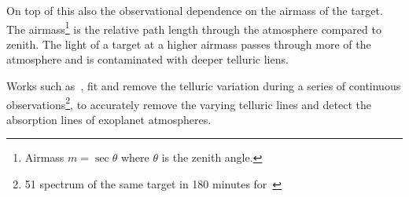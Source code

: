 On top of this also the observational dependence on the airmass of the target.
The airmass\footnote{Airmass $m=\sec{\theta}$ where $\theta$ is the zenith angle.} is the relative path length through the atmosphere compared to zenith.
The light of a target at a higher airmass passes through more of the atmosphere and is contaminated with deeper telluric liens.

Works such as~\citet{snellen_orbital_2010}, fit and remove the telluric variation during a series of continuous observations\footnote{51 spectrum of the same target in 180 minutes for~\citet{snellen_orbital_2010}}, to accurately remove the varying telluric lines and detect the absorption lines of exoplanet atmospheres.



